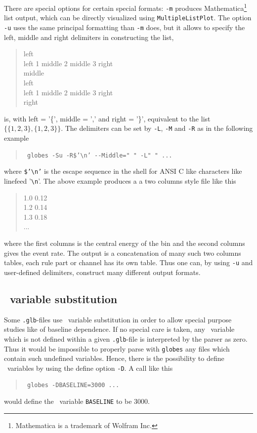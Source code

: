 There are special options for certain special formats: {\tt -m} produces
Mathematica\footnote{Mathematica is a trademark of Wolfram Inc.} list
output, which can be directly visualized using {\tt MultipleListPlot}.
The option {\tt -u} uses the same principal formatting than {\tt -m} does, but
it allows to specify the left, middle and right delimiters in constructing
the list, \eg\
\begin{quote}
left\\
left 1 middle 2 middle 3 right\\
middle\\
left\\
left 1 middle 2 middle 3 right\\
right\\
\end{quote}
is, with left = '\{', middle = ',' and right = '\}',
equivalent to the list $\{\{1,2,3\},\{1,2,3\}\}$. 
The delimiters can be set by {\tt -L}, {\tt -M} and {\tt -R} as in the 
following example
\begin{quote}
{\tt
globes -Su -R\$'\verb+\n+' \verb+--+Middle=" " -L" " ...
}
\end{quote}
where {\tt \$'\verb+\n+'} is the escape sequence in the shell for ANSI C
like characters like linefeed '\verb+\n+'. The above example
produces a a two columns style file like this
\begin{quote}
1.0 0.12\\
1.2 0.14\\
1.3 0.18\\
...
\end{quote}
where the first columns is the central energy of the bin and
the second columns gives the event rate. The output is a concatenation
of many such two columns tables, each rule part or channel has its
own table. Thus one can, by using
{\tt -u} and user-defined delimiters, construct many different  
output formats.

\subsection*{\AEDL\ variable substitution}

Some {\tt .glb}-files use \AEDL\ variable substitution in order to allow
special purpose studies like of baseline dependence. If no special care is
taken, any \AEDL\ variable which is not defined within a given {\tt .glb}-file
is interpreted by the parser as zero. Thus it would be impossible to properly
parse with {\tt globes} any files which contain such undefined variables. 
Hence, there is the possibility to define \AEDL\ variables by using the define
option {\tt -D}. A call like this
\begin{quote}
{\tt
globes -DBASELINE=3000 ...
}
\end{quote}
would define the \AEDL\ variable {\tt BASELINE} to be $3000$.


